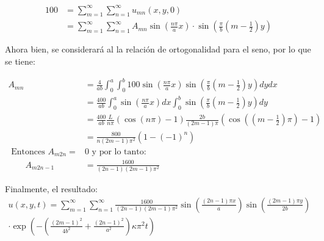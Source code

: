 \begin{solution}
\begin{align*}
    100 &= \sum_{m=1}^\infty\sum_{n=1}^\infty u_{mn}(x,y,0)\\
    &= \sum_{m=1}^\infty\sum_{n=1}^\infty A_{mn} \sin\left(\frac{n\pi}{a}x\right)\cdot \sin\left(\frac{\pi}{b}\left(m-\frac{1}{2}\right) y \right)
\end{align*}

Ahora bien, se considerará al la relación de ortogonalidad para el seno, por lo que se tiene:

\begin{align*}
A_{m n} &=\frac{4}{a b} \int_{0}^{a} \int_{0}^{b} 100 \sin \left(\frac{n \pi}{a}x\right) \sin \left(\frac{\pi}{b}\left(m-\frac{1}{2}\right) y \right) d y d x \\
&=\frac{400}{a b} \int_{0}^{a} \sin \left(\frac{n \pi}{a}x\right) d x \int_{0}^{b} \sin \left(\frac{\pi}{b}\left(m-\frac{1}{2}\right) y \right) d y \\
&=\frac{400}{a b} \frac{L}{n \pi}(\cos (n \pi)-1) \frac{2 b}{(2 m-1) \pi}\left(\cos \left(\left(m-\frac{1}{2}\right) \pi\right)-1\right) \\
&=\frac{800}{n(2 m-1) \pi^{2}}\left(1-(-1)^{n}\right) \\
\text { Entonces } A_{m 2 n}=& 0 \text { y por lo tanto: } \\
\qquad A_{m 2 n-1} &=\frac{1600}{(2 n-1)(2 m-1) \pi^{2}}
\end{align*}

Finalmente, el resultado: 
$$
\begin{array}{r}
u(x, y, t)=\sum_{m=1}^{\infty} \sum_{n=1}^{\infty} \frac{1600}{(2 n-1)(2 m-1) \pi^{2}} \sin \left(\frac{(2 n-1) \pi x}{a}\right) \sin \left(\frac{(2 m-1) \pi y}{2 b}\right) \\
\cdot \exp \left(-\left(\frac{(2 m-1)^{2}}{4 b^{2}}+\frac{(2 n-1)^{2}}{a^{2}}\right) \kappa \pi^{2} t\right)
\end{array}
$$
\end{solution}